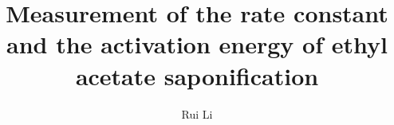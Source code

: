 \documentclass[%
 reprint,
 amsmath,amssymb,
 aps,
10.5pt,
]{revtex4-1}
\begin{document}

\title{Measurement of the rate constant and the activation energy of ethyl acetate saponification}%

\author{Rui Li}
%




\end{document}
